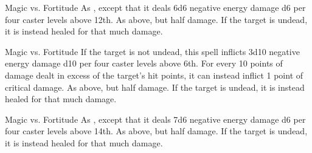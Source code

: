 \begin{spellheader}
\end{spellheader}
\begin{spelleffects}
    \begin{spellattack}{Magic vs. Fortitude}
        \spellsuccess As , except that it deals 6d6 negative energy damage \add d6 per four caster levels above 12th.
        \spellfailure As above, but half damage.
        \spelleffect If the target is undead, it is instead healed for that much damage.
    \end{spellattack}
\end{spelleffects}
\begin{spellfooter}

\end{spellfooter}

\begin{spellheader}
    \spellrng{\rngclose}
\end{spellheader}
\begin{spelleffects}
    \begin{spellattack}{Magic vs. Fortitude}
        \spellsuccess If the target is not undead, this spell inflicts 3d10 negative energy damage \add d10 per four caster levels above 6th. For every 10 points of damage dealt in excess of the target's hit points, it can instead inflict 1 point of critical damage.
        \spellfailure As above, but half damage.
        \spelleffect If the target is undead, it is instead healed for that much damage.
    \end{spellattack}
\end{spelleffects}
\begin{spellfooter}

\end{spellfooter}

\begin{spellheader}
\end{spellheader}
\begin{spelleffects}
    \begin{spellattack}{Magic vs. Fortitude}
        \spellsuccess As , except that it deals 7d6 negative energy damage \add d6 per four caster levels above 14th.
        \spellfailure As above, but half damage.
        \spelleffect If the target is undead, it is instead healed for that much damage.
    \end{spellattack}
\end{spelleffects}
\begin{spellfooter}

\end{spellfooter}

